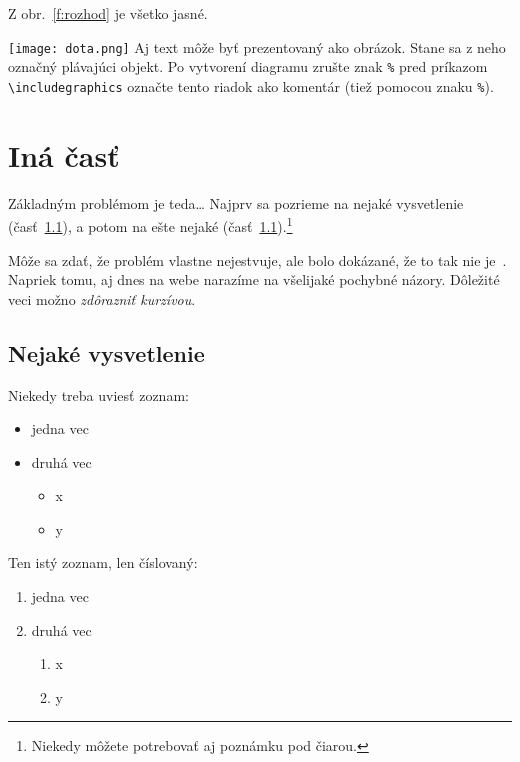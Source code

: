 \documentclass[10pt,twoside,slovak,a4paper]{article}
\begin{document}
Z obr.~\ref{f:rozhod} je všetko jasné. 

\begin{figure*}[tbh]
\centering
\texttt{[image: dota.png]}
Aj text môže byť prezentovaný ako obrázok. Stane sa z neho označný plávajúci objekt. Po vytvorení diagramu zrušte znak \texttt{\%} pred príkazom \verb|\includegraphics| označte tento riadok ako komentár (tiež pomocou znaku \texttt{\%}).
\caption{Rozhodujúci argument.}
\label{f:rozhod}
\end{figure*}



\section{Iná časť} \label{ina}

Základným problémom je teda\ldots{} Najprv sa pozrieme na nejaké vysvetlenie (časť~\ref{ina:nejake}), a potom na ešte nejaké (časť~\ref{ina:nejake}).\footnote{Niekedy môžete potrebovať aj poznámku pod čiarou.}

Môže sa zdať, že problém vlastne nejestvuje\cite{Coplien:MPD}, ale bolo dokázané, že to tak nie je~\cite{Czarnecki:Staged, Czarnecki:Progress}. Napriek tomu, aj dnes na webe narazíme na všelijaké pochybné názory\cite{PLP-Framework}. Dôležité veci možno \emph{zdôrazniť kurzívou}.


\subsection{Nejaké vysvetlenie} \label{ina:nejake}

Niekedy treba uviesť zoznam:

\begin{itemize}
\item jedna vec
\item druhá vec
	\begin{itemize}
	\item x
	\item y
	\end{itemize}
\end{itemize}

Ten istý zoznam, len číslovaný:

\begin{enumerate}
\item jedna vec
\item druhá vec
	\begin{enumerate}
	\item x
	\item y
	\end{enumerate}
\end{enumerate}
\end{document}
